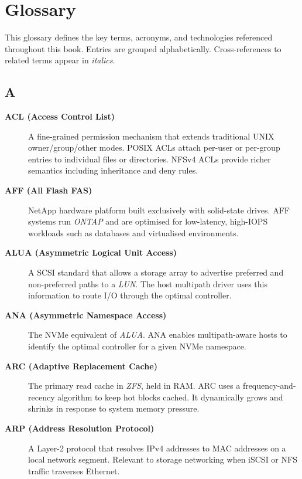 \chapter{Glossary}\label{app:glossary}

This glossary defines the key terms, acronyms, and technologies referenced
throughout this book. Entries are grouped alphabetically. Cross-references to
related terms appear in \textit{italics}.

\section*{A}

\begin{description}

\item[\textbf{ACL (Access Control List)}]
A fine-grained permission mechanism that extends traditional UNIX
owner/group/other modes. POSIX ACLs attach per-user or per-group entries to
individual files or directories. NFSv4 ACLs provide richer semantics
including inheritance and deny rules.

\item[\textbf{AFF (All Flash FAS)}]
NetApp hardware platform built exclusively with solid-state drives. AFF
systems run \textit{ONTAP} and are optimised for low-latency, high-IOPS
workloads such as databases and virtualised environments.

\item[\textbf{ALUA (Asymmetric Logical Unit Access)}]
A SCSI standard that allows a storage array to advertise preferred and
non-preferred paths to a \textit{LUN}. The host multipath driver uses this
information to route I/O through the optimal controller.

\item[\textbf{ANA (Asymmetric Namespace Access)}]
The NVMe equivalent of \textit{ALUA}. ANA enables multipath-aware hosts to
identify the optimal controller for a given NVMe namespace.

\item[\textbf{ARC (Adaptive Replacement Cache)}]
The primary read cache in \textit{ZFS}, held in RAM. ARC uses a
frequency-and-recency algorithm to keep hot blocks cached. It dynamically
grows and shrinks in response to system memory pressure.

\item[\textbf{ARP (Address Resolution Protocol)}]
A Layer-2 protocol that resolves IPv4 addresses to MAC addresses on a local
network segment. Relevant to storage networking when iSCSI or NFS traffic
traverses Ethernet.

\end{description}

